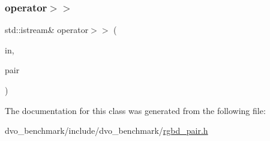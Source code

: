 \mbox{\label{classdvo__benchmark_1_1_rgbd_pair_ab3c51d87c4c55843e497ae35f969f85a}} 
\subsubsection{\texorpdfstring{operator$>$$>$}{operator>>}}
{\footnotesize\ttfamily std\+::istream\& operator$>$$>$ (\begin{DoxyParamCaption}\item[{std\+::istream \&}]{in,  }\item[{\mbox{\hyperlink{classdvo__benchmark_1_1_rgbd_pair}{Rgbd\+Pair}} \&}]{pair }\end{DoxyParamCaption})\hspace{0.3cm}{\ttfamily [friend]}}



The documentation for this class was generated from the following file\+:\begin{DoxyCompactItemize}
\item 
dvo\+\_\+benchmark/include/dvo\+\_\+benchmark/\mbox{\hyperlink{rgbd__pair_8h}{rgbd\+\_\+pair.\+h}}\end{DoxyCompactItemize}
